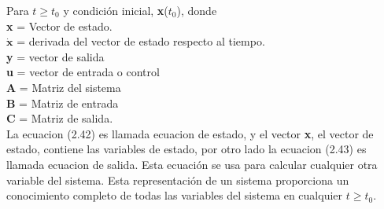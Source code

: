 Para $t \geq t_0$ y condición inicial, \textbf{x}($t_0$), donde \\
\textbf{x} = Vector de estado.\\
$\dot{\textbf{x}}$ = derivada del vector de estado respecto al tiempo.\\
\textbf{y} = vector de salida\\
\textbf{u} = vector de entrada o control\\
\textbf{A} = Matriz del sistema\\
\textbf{B} = Matriz de entrada\\
\textbf{C} = Matriz de salida.\\
La ecuacion (2.42) es llamada ecuacion de estado, y el vector \textbf{x}, el vector de estado, contiene las variables de estado, por otro 
lado la ecuacion (2.43) es llamada ecuacion de salida. Esta ecuación se usa para calcular cualquier otra variable del sistema. Esta 
representación de un sistema proporciona un conocimiento completo de todas las variables del sistema en cualquier $t \geq t_0$.


